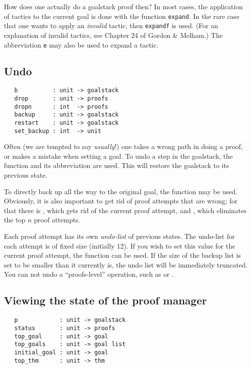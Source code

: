How does one actually do a goalstack proof then? In most cases, the
application of tactics to the current goal is done with the function
\verb+expand+. In the rare case that one wants to apply an
{\it invalid\/} tactic, then \verb+expandf+ is used. (For an
explanation of invalid tactics, see Chapter 24 of Gordon \& Melham.) The
abbreviation \verb+e+ may also be used to expand a tactic.


\subsection{Undo}

\begin{verbatim}
   b          : unit -> goalstack
   drop       : unit -> proofs
   dropn      : int  -> proofs
   backup     : unit -> goalstack
   restart    : unit -> goalstack
   set_backup : int  -> unit
\end{verbatim}

Often (we are tempted to say {\it usually}!) one takes a wrong path
in doing a proof, or makes a mistake when setting a goal. To undo a step
in the goalstack, the function  and its abbreviation
 are used. This will restore the goalstack to its previous
state.


To directly back up all the way to the original goal, the function
 may be used. Obviously, it is also important to get
rid of proof attempts that are wrong; for that there is ,
which gets rid of the current proof attempt, and , which
eliminates the top $n$ proof attempts.


Each proof attempt has its own \emph{undo-list} of previous
states. The undo-list for each attempt is of fixed size (initially
12). If you wish to set this value for the current proof attempt, the
function  can be used. If the size of the backup
list is set to be smaller than it currently is, the undo list will be
immediately truncated. You can not undo a ``proofs-level'' operation, such
as  or .

\subsection{Viewing the state of the proof manager}

\begin{verbatim}
   p            : unit -> goalstack
   status       : unit -> proofs
   top_goal     : unit -> goal
   top_goals    : unit -> goal list
   initial_goal : unit -> goal
   top_thm      : unit -> thm
\end{verbatim}

